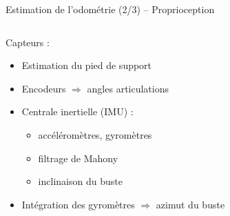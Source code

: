\begin{frame}{Estimation de l'odométrie (2/3) -- Proprioception}
    \begin{columns}
        \begin{column}{0.5\linewidth}
            Capteurs :
            \begin{itemize}
                \item Estimation du pied de support
                \item Encodeurs $\Rightarrow$ angles articulations
                \item Centrale inertielle (IMU) :
                    \begin{itemize}
                        \item accéléromètres, gyromètres
                        \item filtrage de Mahony
                        \item inclinaison du buste
                    \end{itemize}
                \item Intégration des gyromètres $\Rightarrow$ azimut du buste
            \end{itemize}
        \end{column}
        \begin{column}{0.5\linewidth}
            \centering

\end{column}
\end{columns}
\end{frame}
